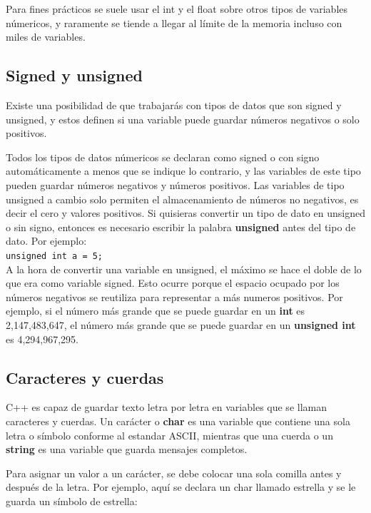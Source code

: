 \documentclass{article}
\begin{document}
Para fines prácticos se suele usar el int y el float sobre otros tipos de variables númericos, y raramente se tiende a llegar al límite de la memoria incluso con miles de variables.

\subsection{Signed y unsigned}

Existe una posibilidad de que trabajarás con tipos de datos que son signed y unsigned, y estos definen si una variable puede guardar números negativos o solo positivos.

Todos los tipos de datos númericos se declaran como signed o con signo automáticamente a menos que se indique lo contrario, y las variables de este tipo pueden guardar números negativos y números positivos. Las variables de tipo unsigned a cambio solo permiten el almacenamiento de números no negativos, es decir el cero y valores positivos. Si quisieras convertir un tipo de dato en unsigned o sin signo, entonces es necesario escribir la palabra \textbf{unsigned} antes del tipo de dato. Por ejemplo: \\

\lstinline{unsigned int a = 5;} \\

A la hora de convertir una variable en unsigned, el máximo se hace el doble de lo que era como variable signed. Esto ocurre porque el espacio ocupado por los números negativos se reutiliza para representar a más numeros positivos. Por ejemplo, si el número más grande que se puede guardar en un \textbf{int} es 2,147,483,647, el número más grande que se puede guardar en un \textbf{unsigned int} es 4,294,967,295.

\subsection{Caracteres y cuerdas}

C++ es capaz de guardar texto letra por letra en variables que se llaman caracteres y cuerdas. Un carácter o \textbf{char} es una variable que contiene una sola letra o símbolo conforme al estandar ASCII, mientras que una cuerda o un \textbf{string} es una variable que guarda mensajes completos.

Para asignar un valor a un carácter, se debe colocar una sola comilla antes y después de la letra. Por ejemplo, aquí se declara un char llamado estrella y se le guarda un símbolo de estrella: \\
\end{document}
